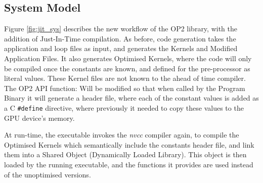 \subsection{System Model}
Figure \ref{fig:jit_sys} describes the new workflow of the OP2 library, with the addition of Just-In-Time compilation. As before, code generation takes the application and loop files as input, and generates the Kernels and Modified Application Files. It also generates Optimised Kernels, where the code will only be compiled once the constants are known, and defined for the pre-processor as literal values. These Kernel files are not known to the ahead of time compiler.
\\\noindent
The OP2 API function:
Will be modified so that when called by the Program Binary it will generate a header file, where each of the constant values is added as a C \verb|#define| directive, where previously it needed to copy these values to the GPU device's memory.
\par
At run-time, the executable invokes the \textit{nvcc} compiler again, to compile the Optimised Kernels which semantically include the constants header file, and link them into a Shared Object (Dynamically Loaded Library). This object is then loaded by the running executable, and the functions it provides are used instead of the unoptimised versions.
